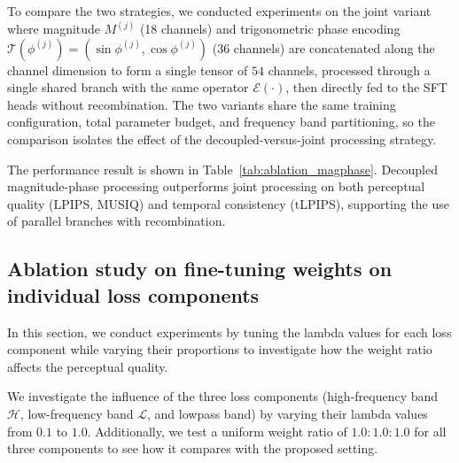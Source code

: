 \begin{table}[b]
\caption{Performance comparison based on the SubbandBlock's 
magnitude-phase processing strategy on REDS4.}
\centering
{}
\label{tab:ablation_magphase}
\end{table}

To compare the two strategies, we conducted experiments on the 
joint variant where magnitude $M^{(j)}$ (18 channels) and 
trigonometric phase encoding $\mathcal{T}(\phi^{(j)}) = 
(\sin\phi^{(j)}, \cos\phi^{(j)})$ (36 channels) are 
concatenated along the channel dimension to form a single 
tensor of $54$ channels, processed through a single shared 
branch with the same operator $\mathcal{E}(\cdot)$, then 
directly fed to the SFT heads without recombination. The two 
variants share the same training configuration, total 
parameter budget, and frequency band partitioning, so the 
comparison isolates the effect of the decoupled-versus-joint 
processing strategy.

The performance result is shown in 
Table~\ref{tab:ablation_magphase}. Decoupled magnitude-phase 
processing outperforms joint processing on both perceptual 
quality (LPIPS, MUSIQ) and temporal consistency (tLPIPS), 
supporting the use of parallel branches with recombination.


\subsection{Ablation study on fine-tuning weights on individual 
loss components}
\label{subsec:ablation_loss_weights}

In this section, we conduct experiments by tuning the lambda 
values for each loss component while varying their proportions 
to investigate how the weight ratio affects the perceptual 
quality.

We investigate the influence of the three loss components 
(high-frequency band $\mathcal{H}$, low-frequency band 
$\mathcal{L}$, and lowpass band) by varying their lambda 
values from $0.1$ to $1.0$. Additionally, we test a uniform 
weight ratio of $1.0{:}1.0{:}1.0$ for all three components 
to see how it compares with the proposed setting.

